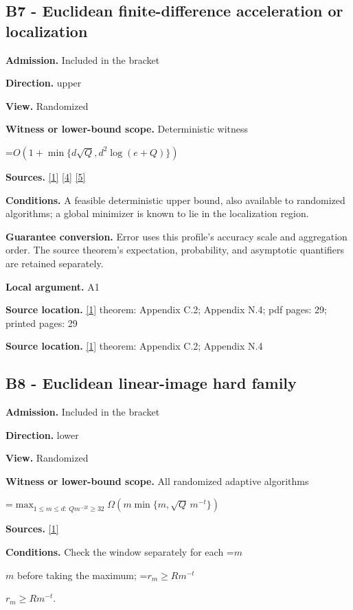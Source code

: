 \documentclass[10pt,a4paper]{article}
\newcommand{\AtlasMath}[1]{\par\begingroup\centering\setbox0=\hbox{$\displaystyle #1$}\ifdim\wd0>1.4\linewidth\typeout{ATLAS WIDE FORMULA: \the\wd0}\fi\ifdim\wd0>\linewidth\resizebox{\linewidth}{!}{\box0}\else\box0\fi\par\endgroup}
\newcommand{\AtlasInlineMath}[1]{\begingroup\setbox0=\hbox{$#1$}\ifdim\wd0>.4\linewidth\endgroup\AtlasMath{#1}\else\endgroup$#1$\fi}
\begin{document}
\subsection{B7 - Euclidean finite-difference acceleration or localization}
\textbf{Admission.} Included in the bracket

\textbf{Direction.} upper

\textbf{View.} Randomized

\textbf{Witness or lower-bound scope.} Deterministic witness

\AtlasMath{O(1+\min\{d\sqrt Q,d^2\log(e+Q)\})}
\textbf{Sources.} \href{https://arxiv.org/html/2610.00345v1}{[1]} \href{https://arxiv.org/html/2607.16558v2}{[4]} \href{https://www.mathnet.ru/php/archive.phtml?jrnid=mzm&option_lang=eng&paperid=1697&wshow=paper}{[5]}

\textbf{Conditions.} A feasible deterministic upper bound, also available to randomized algorithms; a global minimizer is known to lie in the localization region.

\textbf{Guarantee conversion.} Error uses this profile's accuracy scale and aggregation order. The source theorem's expectation, probability, and asymptotic quantifiers are retained separately.

\textbf{Local argument.} A1

\textbf{Source location.} \href{https://arxiv.org/html/2610.00345v1}{[1]} theorem: Appendix C.2; Appendix N.4; pdf pages: 29; printed pages: 29

\textbf{Source location.} \href{https://arxiv.org/html/2610.00345v1}{[1]} theorem: Appendix C.2; Appendix N.4

\subsection{B8 - Euclidean linear-image hard family}
\textbf{Admission.} Included in the bracket

\textbf{Direction.} lower

\textbf{View.} Randomized

\textbf{Witness or lower-bound scope.} All randomized adaptive algorithms

\AtlasMath{\max_{1\le m\le d:\ Qm^{-2t}\ge32}\Omega\!\left(m\min\{m,\sqrt Q\,m^{-t}\}\right)}
\textbf{Sources.} \href{https://arxiv.org/html/2610.00345v1}{[1]}

\textbf{Conditions.} Check the window separately for each \AtlasInlineMath{m} before taking the maximum; \AtlasInlineMath{r_m\ge Rm^{-t}}.
\end{document}
